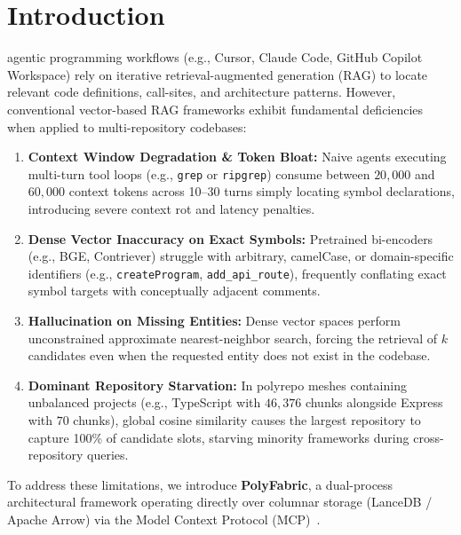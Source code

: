 \documentclass[10pt,journal,compsoc]{IEEEtran}
\begin{document}
\maketitle
\IEEEdisplaynontitleabstractindextext
\IEEEpeerreviewmaketitle

\section{Introduction}
 agentic programming workflows (e.g., Cursor, Claude Code, GitHub Copilot Workspace) rely on iterative retrieval-augmented generation (RAG) to locate relevant code definitions, call-sites, and architecture patterns. However, conventional vector-based RAG frameworks exhibit fundamental deficiencies when applied to multi-repository codebases:

\begin{enumerate}
    \item \textbf{Context Window Degradation \& Token Bloat:} Naive agents executing multi-turn tool loops (e.g., \texttt{grep} or \texttt{ripgrep}) consume between $20{,}000$ and $60{,}000$ context tokens across 10--30 turns simply locating symbol declarations, introducing severe context rot and latency penalties.
    \item \textbf{Dense Vector Inaccuracy on Exact Symbols:} Pretrained bi-encoders (e.g., BGE, Contriever) struggle with arbitrary, camelCase, or domain-specific identifiers (e.g., \texttt{createProgram}, \texttt{add\_api\_route}), frequently conflating exact symbol targets with conceptually adjacent comments.
    \item \textbf{Hallucination on Missing Entities:} Dense vector spaces perform unconstrained approximate nearest-neighbor search, forcing the retrieval of $k$ candidates even when the requested entity does not exist in the codebase.
    \item \textbf{Dominant Repository Starvation:} In polyrepo meshes containing unbalanced projects (e.g., TypeScript with $46{,}376$ chunks alongside Express with $70$ chunks), global cosine similarity causes the largest repository to capture 100\% of candidate slots, starving minority frameworks during cross-repository queries.
\end{enumerate}

To address these limitations, we introduce \textbf{PolyFabric}, a dual-process architectural framework operating directly over columnar storage (LanceDB / Apache Arrow) via the Model Context Protocol (MCP)~\cite{mcp2024}.
\end{document}
